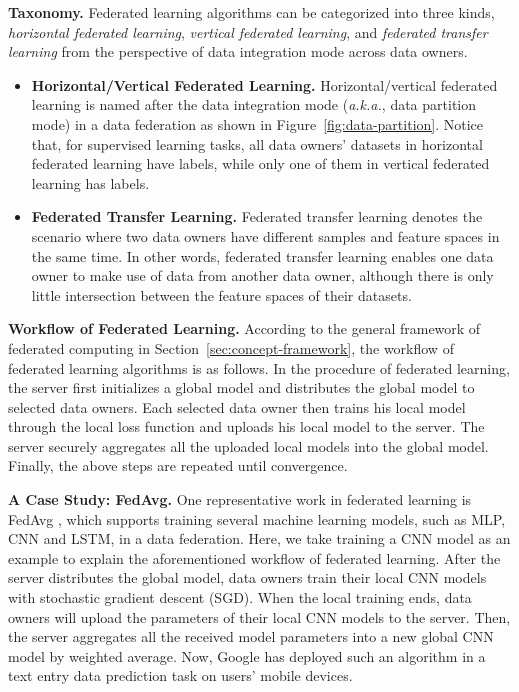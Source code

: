 \documentclass[11pt]{article}
\newcommand{\aka}{\textit{a.k.a.},\xspace}
\newcommand\figref[1]{Figure~\ref{#1}}
\newcommand\secref[1]{Section~\ref{#1}}
\newcommand{\fakeparagraph}[1]{\vspace{1mm}\noindent\textbf{#1.}}
\begin{document}
\fakeparagraph{Taxonomy}
Federated learning algorithms can be categorized into three kinds, 
\textit{horizontal federated learning}, \textit{vertical federated learning}, and \textit{federated transfer learning} \cite{DBLP:journals/tist/YangLCT19} from the perspective of data integration mode across data owners. 

\begin{itemize}
    \item \textbf{Horizontal/Vertical Federated Learning.} 
    Horizontal/vertical federated learning is named after the data integration mode (\aka data partition mode) in a data federation as shown in \figref{fig:data-partition}. Notice that, for supervised learning tasks, all data owners' datasets in horizontal federated learning have labels, while only one of them in vertical federated learning has labels.
    \item \textbf{Federated Transfer Learning.} 
	Federated transfer learning denotes the scenario where two data owners have different samples and feature spaces in the same time. In other words, federated transfer learning enables one data owner to make use of data from another data owner, although there is only little intersection between the feature spaces of their datasets.
\end{itemize}

\fakeparagraph{Workflow of Federated Learning}
According to the general framework of federated computing in \secref{sec:concept-framework}, the workflow of federated learning algorithms is as follows.
In the procedure of federated learning, the server first initializes a global model and distributes the global model to selected data owners. Each selected data owner then trains his local model through the local loss function and uploads his local model to the server. The server securely aggregates all the uploaded local models into the global model. Finally, the above steps are repeated until convergence.

\fakeparagraph{A Case Study: \textsf{FedAvg}}
One representative work in federated learning is \textsf{FedAvg} \cite{DBLP:conf/aistats/McMahanMRHA17}, which supports training several machine learning models, such as MLP, CNN and LSTM, in a data federation.
Here, we take training a CNN model as an example to explain the aforementioned workflow of federated learning. After the server distributes the global model, data owners train their local CNN models with stochastic gradient descent (SGD). 
When the local training ends, data owners will upload the parameters of their local CNN models to the server. 
Then, the server aggregates all the received model parameters into a new global CNN model by weighted average. 
Now, Google has deployed such an algorithm in a text entry data prediction task on users' mobile devices.
\end{document}
